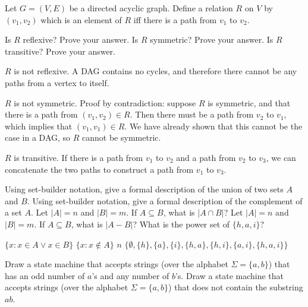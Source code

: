 \documentclass[solution, letterpaper]{cs20exam}
\begin{document}
\problem{}{}
Let $G = (V, E)$ be a directed acyclic graph. Define a relation $R$ on $V$ by $(v_1, v_2)$ which is an element of $R$ iff there is a path from $v_1$ to $v_2$.

\subproblem Is $R$ reflexive? Prove your answer.
\subproblem Is $R$ symmetric? Prove your answer.
\subproblem Is $R$ transitive? Prove your answer.

\begin{solution}

\subsolution $R$ is not reflexive. A DAG contains no cycles, and therefore there cannot be any paths from a vertex to itself.

\subsolution $R$ is not symmetric. Proof by contradiction: suppose $R$ is symmetric, and that there is a path from $(v_1, v_2) \in R$. Then there must be a path from $v_2$ to $v_1$, which implies that $(v_1, v_1) \in R$. We have already shown that this cannot be the case in a DAG, so $R$ cannot be symmetric.

\subsolution $R$ is transitive. If there is a path from $v_1$ to $v_2$ and a path from $v_2$ to $v_3$, we can concatenate the two paths to construct a path from $v_1$ to $v_3$.

\end{solution}


\pagebreak


\problem{}{}

\subproblem Using set-builder notation, give a formal description of the union of two sets $A$ and $B$. %
\subproblem Using set-builder notation, give a formal description of the complement of a set $A$. %
\subproblem Let $|A| = n$ and $|B| = m$. If $A \subseteq B$, what is $|A \cap B|$? %
\subproblem Let $|A| = n$ and $|B| = m$. If $A \subseteq B$, what is $|A - B|$? %
\subproblem What is the power set of $\{ h, a, i\}$? %

\begin{solution}
\subsolution $\{x : x \in A \vee x \in B\}$
\subsolution $\{x : x \notin A\}$
\subsolution $n$
\subsolution $\{\emptyset, \{h\}, \{a\}, \{i\}, \{h, a\}, \{h, i\}, \{a, i\}, \{h, a, i\} \}$
\end{solution}

\problem{}{} 
\subproblem Draw a state machine that accepts strings (over the alphabet $\Sigma = \{a, b\}$) that has an odd number of $a$'s and any number of $b$'s.
\subproblem Draw a state machine that accepts strings (over the alphabet $\Sigma = \{a, b\}$) that does not contain the substring $ab$.
\end{document}
